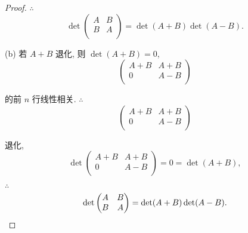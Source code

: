 \documentclass[color=black,device=normal,lang=cn,mode=geye]{elegantnote}
\begin{document}
\begin{proof}
    $\therefore$
    \[\det\begin{pmatrix}
        A & B \\
        B & A \\
    \end{pmatrix}=\det(A+B)\det(A-B).\]

    (b) 若 $A+B$ 退化, 则 $\det(A+B)=0$,
    \[\begin{pmatrix}
        A+B & A+B \\
        0 & A-B \\
    \end{pmatrix}\]

    的前 $n$ 行线性相关. $\therefore$
    \[\begin{pmatrix}
        A+B & A+B \\
        0 & A-B \\
    \end{pmatrix}\]

    退化,
    \[\det\begin{pmatrix}
        A+B & A+B \\
        0 & A-B \\
    \end{pmatrix}=0=\det(A+B),\]

    $\therefore$
    \[\det\begin{pmatrix}
        A & B \\
        B & A \\
    \end{pmatrix}=\det(A+B)\det(A-B).\qedhere\]
\end{proof}
\end{document}
